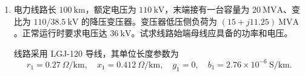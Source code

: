 \begin{enumerate}
\begin{solution}
              若保留横分量，则
              \begin{equation*}
                  U_1=\sqrt{(U_2+\Delta U)^2+(\delta U)^2}
                  =\sqrt{(34+2.824)^2+2.118^2}
                  =\boxed{36.88\ \mathrm{kV}}.
              \end{equation*}

              首端电压超前末端电压
              \begin{equation*}
                  \theta=\arctan\frac{2.118}{36.824}
                  \approx 3.29^\circ.
              \end{equation*}

              若按课件第 7 页忽略横分量，则
              \begin{equation*}
                  U_1\approx U_2+\Delta U
                  =34+2.824
                  =\boxed{36.82\ \mathrm{kV}}.
              \end{equation*}


              \begin{equation*}
                  \boxed{\tilde S_1\approx 8.42+j4.83\ \mathrm{MVA}},
                  \qquad
                  \boxed{U_1\approx 36.8\ \mathrm{kV}}.
              \end{equation*}

              线路有功损耗为 \(0.415\ \mathrm{MW}\)，无功损耗为
              \(0.830\ \mathrm{Mvar}\)，线损率约为
              \begin{equation*}
                  \frac{0.415}{8}\times100\%\approx 5.19\%.
              \end{equation*}

              按课件近似法取 \(36.82\ \mathrm{kV}\)；若保留横分量，则为
              \(36.88\angle3.29^\circ\ \mathrm{kV}\)，两者相差仅 \(0.06\ \mathrm{kV}\)。
          \end{solution}

    \item 电力线路长 \(100\ \mathrm{km}\)，额定电压为 \(110\ \mathrm{kV}\)，末端接有一台容量为
          \(20\ \mathrm{MVA}\)、变比为 \(110/38.5\ \mathrm{kV}\) 的降压变压器。变压器低压侧负荷为
          \((15+j11.25)\ \mathrm{MVA}\)。正常运行时要求电压达 \(36\ \mathrm{kV}\)。试求线路始端母线应具备的功率和电压。

          线路采用 LGJ-120 导线，其单位长度参数为
          \begin{equation*}
              r_1=0.27\ \Omega/\mathrm{km},\quad
              x_1=0.412\ \Omega/\mathrm{km},\quad
              g_1=0,\quad
              b_1=2.76\times10^{-6}\ \mathrm{S/km}.
          \end{equation*}


\end{enumerate}
